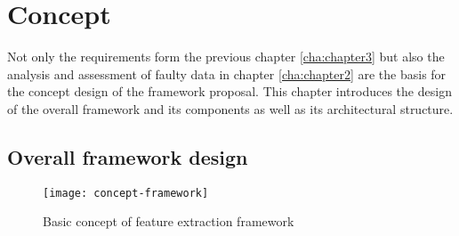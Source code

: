 \chapter{Concept\label{cha:chapter4}}

Not only the requirements form the previous chapter \ref{cha:chapter3} but also the analysis and assessment of faulty data in chapter \ref{cha:chapter2} are the basis for the concept design of the framework proposal. This chapter introduces the design of the overall framework and its components as well as its architectural structure.

\section{Overall framework design \label{sec:overalldesign}}

\begin{figure}[htb]
  \centering
  \texttt{[image: concept-framework]}\\
  \caption{Basic concept of feature extraction framework}
  \label{fig:basicconcept}
\end{figure}

